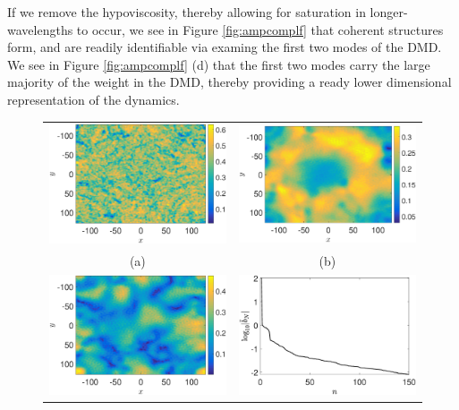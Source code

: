 \documentclass[a4paper,11pt]{article}
\begin{document}
If we remove the hypoviscosity, thereby allowing for saturation in longer-wavelengths to occur, we see in Figure \ref{fig:ampcomplf} that coherent structures form, and are readily identifiable via examing the first two modes of the DMD.  We see in Figure \ref{fig:ampcomplf} (d) that the first two modes carry the large majority of the weight in the DMD, thereby providing a ready lower dimensional representation of the dynamics.  
\begin{figure}
\centering
\begin{tabular}{cc}
\includegraphics[width=.51\textwidth]{amplitude_K_128_Lx_128_tf_1pt5e4} &\hspace{-15pt} \includegraphics[width=.51\textwidth]{dmd1_amplitude_K_128_Lx_128_tf_1pt5e4}\\
(a) & (b)\\
\includegraphics[width=.51\textwidth]{dmd2_amplitude_K_128_Lx_128_tf_1pt5e4} &\hspace{-15pt} \includegraphics[width=.51\textwidth]{dmd_mags_K_128_Lx_128_tf_1pt5e4}\\

\end{tabular}
\end{figure}
\end{document}
